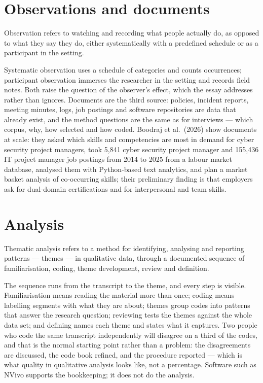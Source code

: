 \documentclass[11pt,a4paper,british,twoside=false,headings=small,chapterprefix=false,numbers=noenddot]{scrbook}
\newenvironment{block}[1]{\begin{tcolorbox}[scriptbox, title={#1}]}{\end{tcolorbox}}
\begin{document}
\section{Observations and documents}

\begin{block}{Observation}
Observation refers to watching and recording what people actually do, as opposed to what they say they do, either systematically with a predefined schedule or as a participant in the setting.
\end{block}

Systematic observation uses a schedule of categories and counts occurrences; participant observation immerses the researcher in the setting and records field notes. Both raise the question of the observer's effect, which the essay addresses rather than ignores. Documents are the third source: policies, incident reports, meeting minutes, logs, job postings and software repositories are data that already exist, and the method questions are the same as for interviews --- which corpus, why, how selected and how coded. Boodraj et al.\ (2026) show documents at scale: they asked which skills and competencies are most in demand for cyber security project managers, took 5,841 cyber security project manager and 155,436 IT project manager job postings from 2014 to 2025 from a labour market database, analysed them with Python-based text analytics, and plan a market basket analysis of co-occurring skills; their preliminary finding is that employers ask for dual-domain certifications and for interpersonal and team skills.

\section{Analysis}

\begin{block}{Thematic analysis}
Thematic analysis refers to a method for identifying, analysing and reporting patterns --- themes --- in qualitative data, through a documented sequence of familiarisation, coding, theme development, review and definition.
\end{block}

The sequence runs from the transcript to the theme, and every step is visible. Familiarisation means reading the material more than once; coding means labelling segments with what they are about; themes group codes into patterns that answer the research question; reviewing tests the themes against the whole data set; and defining names each theme and states what it captures. Two people who code the same transcript independently will disagree on a third of the codes, and that is the normal starting point rather than a problem: the disagreements are discussed, the code book refined, and the procedure reported --- which is what quality in qualitative analysis looks like, not a percentage. Software such as NVivo supports the bookkeeping; it does not do the analysis.
\end{document}
